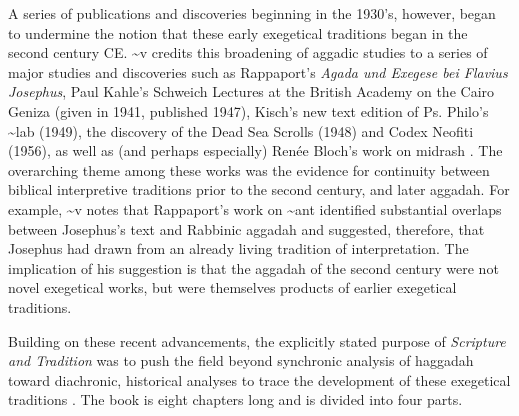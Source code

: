 A series of publications and discoveries beginning in the 1930's,
however, began to undermine the notion that these early exegetical
traditions began in the second century CE. \textasciitilde{}v credits
this broadening of aggadic studies to a series of major studies and
discoveries such as Rappaport's \emph{Agada und Exegese bei Flavius
Josephus},\autocite{rappaport1930} Paul Kahle's Schweich Lectures at the
British Academy on the Cairo Geniza (given in 1941, published
1947),\autocite{kahle1947} Kisch's new text edition of Ps. Philo's
\textasciitilde{}lab (1949),\autocite{kisch1949} the discovery of the
Dead Sea Scrolls (1948) and Codex Neofiti (1956), as well as (and
perhaps especially) Renée Bloch's work on midrash
\autocites{bloch1954}{bloch1955_repr}[3--7]{vermes1961}. The overarching
theme among these works was the evidence for continuity between biblical
interpretive traditions prior to the second century, and later aggadah.
For example, \textasciitilde{}v notes that Rappaport's work on
\textasciitilde{}ant identified substantial overlaps between Josephus's
text and Rabbinic aggadah and suggested, therefore, that Josephus had
drawn from an already living tradition of interpretation. The
implication of his suggestion is that the aggadah of the second century
were not novel exegetical works, but were themselves products of earlier
exegetical traditions.

Building on these recent advancements, the explicitly stated purpose of
\emph{Scripture and Tradition} was to push the field beyond synchronic
analysis of haggadah toward diachronic, historical analyses to trace the
development of these exegetical traditions \autocites[1]{vermes1961}[See
also][]{bloch1955_repr}. The book is eight chapters long and is divided
into four parts.

